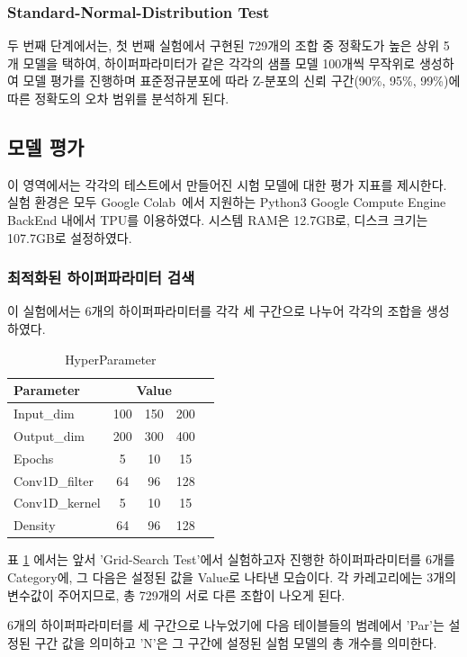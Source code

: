 \documentclass{kcc}
\begin{document}
\subsubsection{Standard-Normal-Distribution Test}
두 번째 단계에서는, 첫 번째 실험에서 구현된 729개의 조합 중 정확도가 높은 상위 5개 모델을 택하여, 하이퍼파라미터가 같은 각각의 샘플 모델 100개씩 무작위로 생성하여 모델 평가를 진행하며 표준정규분포\cite{cite:NormalDistribution}에 따라 Z-분포의 신뢰 구간(90\%, 95\%, 99\%)에 따른 정확도의 오차 범위를 분석하게 된다.

\subsection{모델 평가}
이 영역에서는 각각의 테스트에서 만들어진 시험 모델에 대한 평가 지표를 제시한다.
실험 환경은 모두 Google Colab~\cite{cite:google}에서 지원하는 Python3 Google Compute Engine BackEnd 내에서 TPU를 이용하였다.
시스템 RAM은 12.7GB로, 디스크 크기는 107.7GB로 설정하였다.

\subsubsection{최적화된 하이퍼파라미터 검색}
\label{search}
이 실험에서는 6개의 하이퍼파라미터를 각각 세 구간으로 나누어 각각의 조합을 생성하였다.
\begin{table}[!ht]
\centering
\setlength{\belowcaptionskip}{5pt}
\caption{HyperParameter}
\label{tab:HyperParameter}
\begin{tabular}{@{}lcccc@{}} 
\toprule
{\bfseries Parameter} & \multicolumn{3}{c}{\bfseries Value} \\
\midrule
Input\_dim  & 100 & 150 & 200 \\
Output\_dim  & 200 & 300 & 400 \\
Epochs & 5 & 10 & 15 \\
Conv1D\_filter & 64 & 96 & 128 \\
Conv1D\_kernel & 5 & 10 & 15 \\
Density & 64 & 96 & 128 \\
\bottomrule
\end{tabular}
\end{table}

표 \ref{tab:HyperParameter} 에서는 앞서 'Grid-Search Test'에서 실험하고자 진행한 하이퍼파라미터를 6개를 Category에, 그 다음은 설정된 값을 Value로 나타낸 모습이다. 각 카레고리에는 3개의 변수값이 주어지므로, 총 729개의 서로 다른 조합이 나오게 된다.

6개의 하이퍼파라미터를 세 구간으로 나누었기에 다음 테이블들의 범례에서 'Par'는 설정된 구간 값을 의미하고 'N'은 그 구간에 설정된 실험 모델의 총 개수를 의미한다. 
\end{document}
